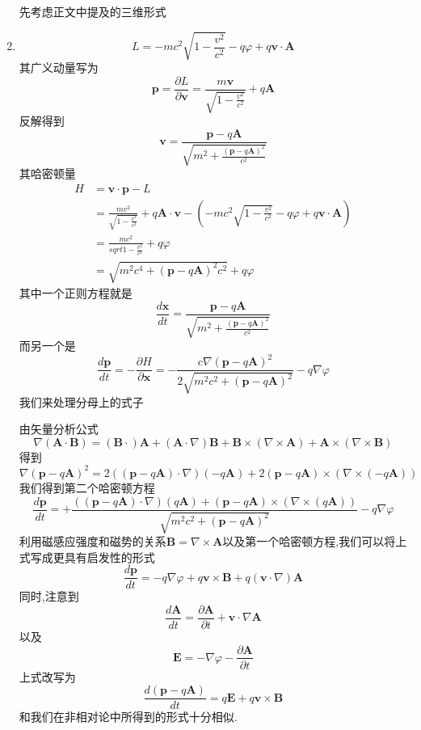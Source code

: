 \begin{solution}
    \begin{enumerate}[label=(\arabic*)]
    先考虑正文中提及的三维形式
        \item $$L=-mc^2\sqrt{1-\frac{v^2}{c^2}}-q\varphi+q\textbf{v}\cdot\textbf{A}$$
    其广义动量写为
    $$\textbf{p}=\frac{\partial L}{\partial \textbf{v}}=\frac{m\textbf{v}}{\sqrt{1-\frac{v^2}{c^2}}}+q\textbf{A}$$
    反解得到
    $$\textbf{v}=\frac{\textbf{p}-q\textbf{A}}{\sqrt{m^2+\frac{(\textbf{p}-q\textbf{A})^2}{c^2}}}$$
    其哈密顿量
    \begin{align*}
    H&=\textbf{v}\cdot\textbf{p}-L\\
     &=\frac{mv^2}{\sqrt{1-\frac{v^2}{c^2}}}+q\textbf{A}\cdot\textbf{v}-(-mc^2\sqrt{1-\frac{v^2}{c^2}}-q\varphi+q\textbf{v}\cdot\textbf{A})\\
     &=\frac{mc^2}{sqrt{1-\frac{v^2}{c^2}}}+q\varphi\\
     &=\sqrt{m^2c^4+(\textbf{p}-q\textbf{A})^2c^2}+q\varphi
    \end{align*}
    其中一个正则方程就是
    $$\frac{d\textbf{x}}{dt}=\frac{\textbf{p}-q\textbf{A}}{\sqrt{m^2+\frac{(\textbf{p}-q\textbf{A})^2}{c^2}}}$$
    而另一个是
    $$\frac{d\textbf{p}}{dt}=-\frac{\partial H}{\partial \textbf{x}}=-\frac{c\nabla (\textbf{p}-q\textbf{A})^2}{2\sqrt{m^2c^2+(\textbf{p}-q\textbf{A})^2}}-q\nabla\varphi$$
    我们来处理分母上的式子
    
    由矢量分析公式
    $$\nabla(\textbf{A}\cdot\textbf{B})=(\textbf{B}\cdot)\textbf{A}+(\textbf{A}\cdot \nabla)\textbf{B}+\textbf{B}\times(\nabla\times\textbf{A})+\textbf{A}\times(\nabla\times\textbf{B})$$
    得到
    $$\nabla (\textbf{p}-q\textbf{A})^2=2((\textbf{p}-q\textbf{A})\cdot\nabla)(-q\textbf{A})+2(\textbf{p}-q\textbf{A})\times(\nabla\times(-q\textbf{A}))$$
    我们得到第二个哈密顿方程
    $$\frac{d\textbf{p}}{dt}=+\frac{((\textbf{p}-q\textbf{A})\cdot\nabla)(q\textbf{A})+(\textbf{p}-q\textbf{A})\times(\nabla\times(q\textbf{A}))}{\sqrt{m^2c^2+(\textbf{p}-q\textbf{A})^2}}-q\nabla\varphi$$
    利用磁感应强度和磁势的关系$\textbf{B}=\nabla\times\textbf{A}$以及第一个哈密顿方程,我们可以将上式写成更具有启发性的形式
    $$\frac{d\textbf{p}}{dt}=-q\nabla\varphi+q\textbf{v}\times\textbf{B}+q(\textbf{v}\cdot\nabla)\textbf{A}$$
    同时,注意到
    $$\frac{d\textbf{A}}{dt}=\frac{\partial \textbf{A}}{\partial t}+\textbf{v}\cdot\nabla\textbf{A}$$
    以及
    $$\textbf{E}=-\nabla \varphi-\frac{\partial \textbf{A}}{\partial t}$$
    上式改写为
    $$\frac{d(\textbf{p}-q\textbf{A})}{dt}=q\textbf{E}+q\textbf{v}\times\textbf{B}$$
    和我们在非相对论中所得到的形式十分相似.


\end{enumerate}
\end{solution}
